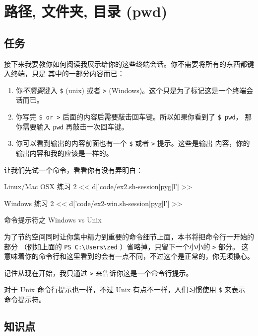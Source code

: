 \chapter{路径, 文件夹, 目录 (pwd)}

\section{任务}

接下来我要教你如何阅读我展示给你的这些终端会话。你不需要将所有的东西都键入终端，只是
其中的一部分内容而已：

\begin{enumerate} 
\item 你\emph{不需要}键入 \verb|$| (unix) 或者
    \verb|>| (Windows)。这个只是为了标记这是一个终端会话而已。
\item 你写完 \verb|$ or >| 后面的内容后需要敲击回车键。所以如果你看到了 \verb|$ pwd|，
那你需要输入 \verb|pwd| 再敲击一次回车键。
\item 你可以看到输出的内容前面也有一个 \verb|$| 或者 \verb|>| 提示。这些是输出
内容，你的输出内容和我的应该是一样的。
\end{enumerate}

让我们先试一个命令，看看你有没有弄明白：

\begin{code}{Linux/Mac OSX 练习 2}
<< d['code/ex2.sh-session|pyg|l'] >>
\end{code}

\begin{code}{Windows 练习 2}
<< d['code/ex2-win.sh-session|pyg|l'] >>
\end{code}

\begin{aside}{命令提示符之 Windows vs Unix }

为了节约空间同时让你集中精力到重要的命令细节上面，本书将把命令行一开始的部分
（例如上面的 \verb|PS C:\Users\zed| ）省略掉，只留下一个小小的 \verb|>| 部分。
这意味着你的命令行和这里看到的会有一点不同，不过这个是正常的，你无须操心。

记住从现在开始，我只通过 \verb|>| 来告诉你这是一个命令行提示。

对于 Unix 命令行提示也一样，不过 Unix 有点不一样，人们习惯使用 \verb|$| 来表示
命令提示符。

\end{aside}

\section{知识点}

